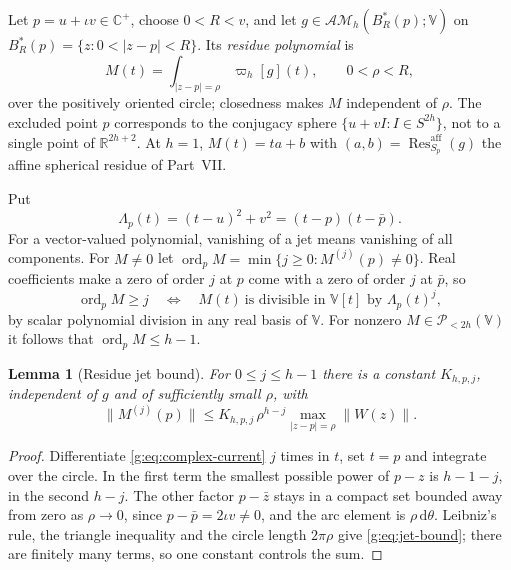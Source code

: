 \documentclass[11pt,a4paper]{article}
\numberwithin{equation}{section}
\newtheorem{lemma}[theorem]{Lemma}
\theoremstyle{definition}
\theoremstyle{remark}
\theoremstyle{plain}
\newcommand{\RR}{\mathbb R}
\newcommand{\CC}{\mathbb C}
\newcommand{\Cplus}{\CC^{+}}
\newcommand{\AM}{\mathcal{AM}}
\newcommand{\Sp}{S_{p}}
\newcommand{\abs}[1]{\lvert #1\rvert}
\newcommand{\norm}[1]{\lVert #1\rVert}
\newcommand{\dd}{\mathrm d}
\newcommand{\Resaff}{\operatorname{Res}^{\mathrm{aff}}}
\newcommand{\VV}{\mathbb V}                       %
\newcommand{\PolH}{\mathscr P_{<2h}(\VV)}
\newcommand{\cur}{\varpi}                         %
\newcommand{\Rq}{\Lambda}                         %
\DeclareMathOperator{\ord}{ord}
\begin{document}
Let $p=u+\iota v\in\Cplus$, choose $0<R<v$, and let $g\in\AM_h(B^*_R(p);\VV)$ on
$B^*_R(p)=\{z:0<\abs{z-p}<R\}$. Its \emph{residue polynomial} is
\begin{equation}\label{g:eq:residue-definition}
 M(t)=\int_{\abs{z-p}=\rho}\cur_h[g](t),\qquad 0<\rho<R,
\end{equation}
over the positively oriented circle; closedness makes $M$ independent of
$\rho$. The excluded point $p$ corresponds to the conjugacy sphere
$\{u+vI:I\in S^{2h}\}$, not to a single point of $\RR^{2h+2}$. At $h=1$,
$M(t)=ta+b$ with $(a,b)=\Resaff_{\Sp}(g)$ the affine spherical residue of
Part~VII.

Put
\begin{equation}\label{g:eq:quadratic}
 \Rq_p(t)=(t-u)^2+v^2=(t-p)(t-\bar p).
\end{equation}
For a vector-valued polynomial, vanishing of a jet means vanishing of all
components. For $M\ne0$ let $\ord_pM=\min\{j\ge0:M^{(j)}(p)\ne0\}$. Real
coefficients make a zero of order $j$ at $p$ come with a zero of order $j$ at
$\bar p$, so
\begin{equation}\label{g:eq:order-divisibility}
 \ord_pM\ge j\quad\Longleftrightarrow\quad
 M(t)\ \text{is divisible in }\VV[t]\text{ by }\Rq_p(t)^j,
\end{equation}
by scalar polynomial division in any real basis of $\VV$. For nonzero
$M\in\PolH$ it follows that $\ord_pM\le h-1$.

\begin{lemma}[Residue jet bound]
\label{g:lem:jet-bound}
For $0\le j\le h-1$ there is a constant $K_{h,p,j}$, independent of $g$ and
of sufficiently small $\rho$, with
\begin{equation}\label{g:eq:jet-bound}
 \norm{M^{(j)}(p)}\le K_{h,p,j}\,\rho^{h-j}\max_{\abs{z-p}=\rho}\norm{W(z)}.
\end{equation}
\end{lemma}

\begin{proof}
Differentiate \eqref{g:eq:complex-current} $j$ times in $t$, set $t=p$ and
integrate over the circle. In the first term the smallest possible power of
$p-z$ is $h-1-j$, in the second $h-j$. The other factor $p-\bar z$ stays in a
compact set bounded away from zero as $\rho\to0$, since $p-\bar p=2\iota v\ne0$,
and the arc element is $\rho\,\dd\theta$. Leibniz's rule, the triangle
inequality and the circle length $2\pi\rho$ give \eqref{g:eq:jet-bound}; there
are finitely many terms, so one constant controls the sum.
\end{proof}
\end{document}
